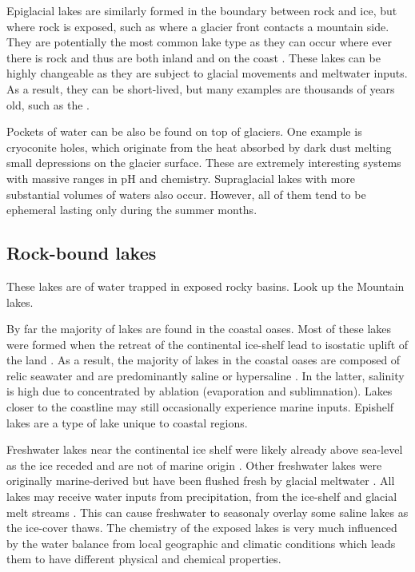 Epiglacial lakes are similarly formed in the boundary between rock and ice, but where rock is exposed, such as where a glacier front contacts a mountain side.
They are potentially the most common lake type as they can occur where ever there is rock and thus are both inland and on the coast \cite{Hodgson2012}. %
These lakes can be highly changeable as they are subject to glacial movements and meltwater inputs.
As a result, they can be short-lived, but many examples are thousands of years old, such as the .

Pockets of water can be also be found on top of glaciers. 
One example is cryoconite holes, which originate from the heat absorbed by dark dust melting small depressions on the glacier surface. 
These are extremely interesting systems with massive ranges in pH and chemistry.
Supraglacial lakes with more substantial volumes of waters also occur.
However, all of them tend to be ephemeral lasting only during the summer months.

\subsection{Rock-bound lakes}
These lakes are of water trapped in exposed rocky basins.
Look up the Mountain lakes. %

By far the majority of lakes are found in the coastal oases. %
Most of these lakes were formed when the retreat of the continental ice-shelf lead to isostatic uplift of the land \cite{Burton1981}. %
As a result, the majority of lakes in the coastal oases are composed of relic seawater and are predominantly saline or hypersaline \cite{Burke1988}.
In the latter, salinity is high due to concentrated by ablation (evaporation and sublimnation). %
Lakes closer to the coastline may still occasionally experience marine inputs. %
Epishelf lakes are a type of lake unique to coastal regions.

Freshwater lakes near the continental ice shelf were likely already above sea-level as the ice receded and are not of marine origin \cite{Bronge1996}. %
Other freshwater lakes were originally marine-derived but have been flushed fresh by glacial meltwater \cite{Pickard1986}.
All lakes may receive water inputs from precipitation, from the ice-shelf and glacial melt streams \cite{Burton1981}. 
This can cause freshwater to seasonaly overlay some saline lakes as the ice-cover thaws.
The chemistry of the exposed lakes is very much influenced by the water balance from local geographic and climatic conditions which leads them to have different physical and chemical properties.

